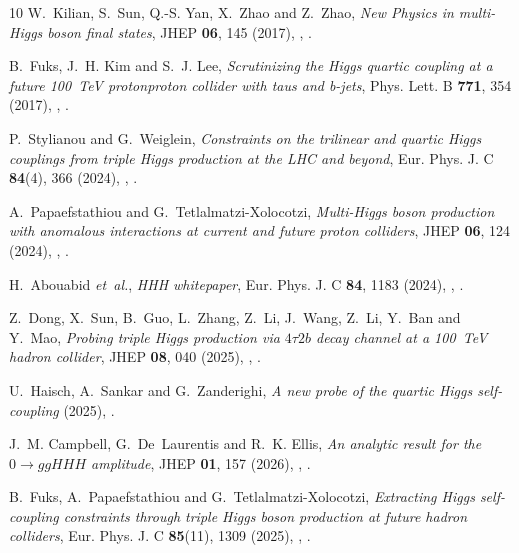 \documentclass{SciPost}
\begin{document}
\begin{thebibliography}{10}
W.~Kilian, S.~Sun, Q.-S. Yan, X.~Zhao and Z.~Zhao,
\newblock \emph{{New Physics in multi-Higgs boson final states}},
\newblock JHEP \textbf{06}, 145 (2017),
\newblock {},
\newblock {}.

B.~Fuks, J.~H. Kim and S.~J. Lee,
\newblock \emph{{Scrutinizing the Higgs quartic coupling at a future 100~TeV proton\textendash{}proton collider with taus and b-jets}},
\newblock Phys. Lett. B \textbf{771}, 354 (2017),
\newblock {},
\newblock {}.

P.~Stylianou and G.~Weiglein,
\newblock \emph{{Constraints on the trilinear and quartic Higgs couplings from triple Higgs production at the LHC and beyond}},
\newblock Eur. Phys. J. C \textbf{84}(4), 366 (2024),
\newblock {},
\newblock {}.

A.~Papaefstathiou and G.~Tetlalmatzi-Xolocotzi,
\newblock \emph{{Multi-Higgs boson production with anomalous interactions at current and future proton colliders}},
\newblock JHEP \textbf{06}, 124 (2024),
\newblock {},
\newblock {}.

H.~Abouabid \emph{et~al.},
\newblock \emph{{HHH whitepaper}},
\newblock Eur. Phys. J. C \textbf{84}, 1183 (2024),
\newblock {},
\newblock {}.

Z.~Dong, X.~Sun, B.~Guo, L.~Zhang, Z.~Li, J.~Wang, Z.~Li, Y.~Ban and Y.~Mao,
\newblock \emph{{Probing triple Higgs production via $4\tau 2b$ decay channel at a 100~TeV hadron collider}},
\newblock JHEP \textbf{08}, 040 (2025),
\newblock {},
\newblock {}.

U.~Haisch, A.~Sankar and G.~Zanderighi,
\newblock \emph{{A new probe of the quartic Higgs self-coupling}}  (2025),
\newblock {}.

J.~M. Campbell, G.~De~Laurentis and R.~K. Ellis,
\newblock \emph{{An analytic result for the $0 \to ggHHH$ amplitude}},
\newblock JHEP \textbf{01}, 157 (2026),
\newblock {},
\newblock {}.

B.~Fuks, A.~Papaefstathiou and G.~Tetlalmatzi-Xolocotzi,
\newblock \emph{{Extracting Higgs self-coupling constraints through triple Higgs boson production at future hadron colliders}},
\newblock Eur. Phys. J. C \textbf{85}(11), 1309 (2025),
\newblock {},
\newblock {}.


\end{thebibliography}
\end{document}
